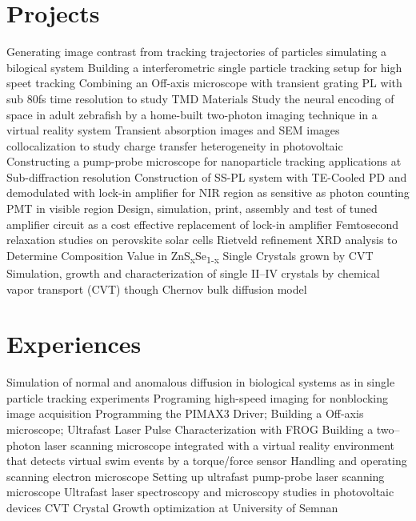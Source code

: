 \documentclass[11pt,a4paper]{moderncv}
\begin{document}
\section{Projects}
		{Generating image contrast from tracking trajectories of particles 
		simulating a bilogical system}
		{Building a interferometric single particle tracking setup 
		for high speet tracking}
		{Combining an Off-axis microscope with 
		transient grating PL with sub 80fs time resolution 
		to study TMD Materials}
		{Study the neural encoding of space in adult zebrafish 
		by a home-built two-photon 
		imaging technique in a virtual reality system}
		{Transient absorption images and SEM images collocalization 
		to study charge transfer heterogeneity in photovoltaic}
		{Constructing a pump-probe microscope for nanoparticle tracking 
		applications at Sub-diffraction resolution}
		{Construction of SS-PL system with TE-Cooled PD 
		and demodulated with lock-in amplifier for NIR region as 
		sensitive as photon counting PMT in visible region}
		{Design, simulation, print, assembly and test 
		of tuned amplifier circuit as a cost effective replacement 
		of lock-in amplifier}
		{Femtosecond relaxation studies on perovskite solar cells}
		{Rietveld refinement XRD analysis to 
		Determine Composition Value in ZnS\textsubscript{x}Se\textsubscript{1-x} 
		Single Crystals grown by CVT}
		{Simulation, growth and characterization 
		of single II--IV crystals 
		by chemical vapor transport (CVT) though Chernov bulk diffusion model}
\section{Experiences}
		{Simulation of normal and anomalous diffusion in biological systems 
		as in single particle tracking experiments}
		{Programing high-speed imaging for nonblocking 
		image acquisition}
		{Programming the PIMAX3 Driver; Building a Off-axis microscope; 
		Ultrafast Laser Pulse Characterization with FROG}
		{Building a two--photon laser scanning microscope 
		integrated with a virtual reality environment 
		that detects virtual swim events by a torque/force sensor}
		{Handling and operating scanning electron microscope}
		{Setting up ultrafast pump-probe laser scanning microscope}
		{Ultrafast laser spectroscopy and microscopy
	studies in photovoltaic devices}
		{CVT Crystal Growth optimization at University of Semnan}
\end{document}
